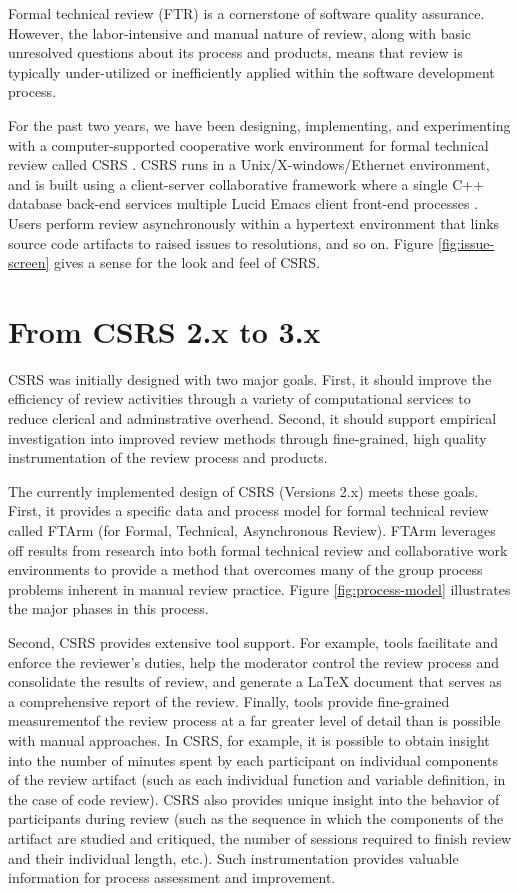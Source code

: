Formal technical review (FTR) is a cornerstone of software quality
assurance.  However, the labor-intensive and manual nature of review, along
with basic unresolved questions about its process and products, means that
review is typically under-utilized or inefficiently applied within the
software development process.  

For the past two years, we have been designing, implementing, and
experimenting with a computer-supported cooperative work environment for
formal technical review called CSRS \cite{csdl-93-17}.  CSRS runs in a
Unix/X-windows/Ethernet environment, and is built using a client-server
collaborative framework where a single C++ database back-end
services multiple Lucid Emacs client front-end processes \cite{csdl-92-01}.
Users perform review asynchronously within a hypertext environment that
links source code artifacts to raised issues to resolutions, and so on.
Figure \ref{fig:issue-screen} gives a sense for the look and feel of CSRS.

\section{From CSRS 2.x to 3.x}

CSRS was initially designed with two major goals.  First, it should improve
the efficiency of review activities through a variety of computational
services to reduce clerical and adminstrative overhead.  Second, it should
support empirical investigation into improved review methods through
fine-grained, high quality instrumentation of the review process and
products.

The currently implemented design of CSRS (Versions 2.x) meets these goals.
First, it provides a specific data and process model for formal technical
review called FTArm (for Formal, Technical, Asynchronous Review).  FTArm
leverages off results from research into both formal technical review and
collaborative work environments to provide a method that overcomes many
of the group process problems inherent in manual review practice. Figure
\ref{fig:process-model} illustrates the major phases in this process.

Second, CSRS provides extensive tool support. For example, tools facilitate
and enforce the reviewer's duties, help the moderator control the review
process and consolidate the results of review, and generate a LaTeX
document that serves as a comprehensive report of the review.  Finally,
tools provide fine-grained measurementof the review process at a far
greater level of detail than is possible with manual approaches.  In CSRS,
for example, it is possible to obtain insight into the number of minutes
spent by each participant on individual components of the review artifact
(such as each individual function and variable definition, in the case of
code review). CSRS also provides unique insight into the behavior of
participants during review (such as the sequence in which the components of
the artifact are studied and critiqued, the number of sessions required to
finish review and their individual length, etc.).  Such instrumentation
provides valuable information for process assessment and improvement.

